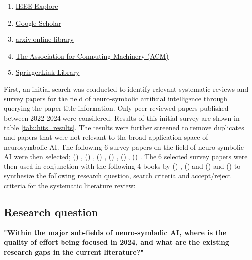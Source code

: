 \documentclass[journal]{IEEEtran}
\newcommand{\citeauthornum}[1]{\citeauthor{#1} (\citeyear{#1}) \cite{#1}}
\begin{document}
\begin{enumerate}
    \item \href{https://ieeexplore.ieee.org/Xplore/home.jsp}{IEEE Explore}
    \item \href{http://scholar.google.com}{Google Scholar}
    \item \href{https://arxiv.org/}{arxiv online library}
    \item \href{http://portal.acm.org/portal.cfm}{The Association for Computing Machinery (ACM) }
    \item \href{http://www.springerlink.com}{SpringerLink Library}
\end{enumerate}


First, an initial search was conducted to identify relevant systematic reviews and survey papers for the field of neuro-symbolic artificial intelligence through querying the paper title information. Only peer-reviewed papers published between 2022-2024 were considered. Results of this initial survey are shown in table \ref{tab::hits_results}. The results were further screened to remove duplicates and papers that were not relevant to the broad application space of neurosymbolic AI. The following 6 survey papers on the field of neuro-symbolic AI were then selected; \citeauthornum{Gibaut2023},  \citeauthornum{Yu2021}, \citeauthornum{Wan2024}, \citeauthornum{Marra2024}, \citeauthornum{MichelDeletie2024}, \citeauthornum{Bouneffouf2022}. The 6 selected survey papers were then used in conjunction with the following 4 books by \citeauthornum{Dingli2023}, \citeauthornum{Hitzler2023} and \citeauthornum{Hitzler2021} and \citeauthornum{Shakarian2023} to synthesize the following research question, search criteria and accept/reject criteria for the systematic literature review: 

\subsection{Research question}\label{subsec:research_quest}
\textbf{"Within the major sub-fields of neuro-symbolic AI, where is the quality of effort being focused in 2024, and what are the existing research gaps in the current literature?"}
\end{document}
